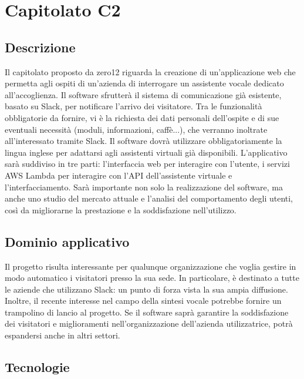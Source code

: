 \newpage
\section{Capitolato C2}

\subsection{Descrizione}

Il capitolato proposto da zero12 riguarda la creazione di un'applicazione
web che permetta agli ospiti di un'azienda di interrogare un assistente
vocale dedicato all'accoglienza. Il software sfrutterà il sistema
di comunicazione già esistente, basato su Slack, per notificare l'arrivo dei visitatore. Tra le funzionalità obbligatorie da fornire,
vi è la richiesta dei dati personali dell'ospite e di sue eventuali
necessità (moduli, informazioni, caffè...), che verranno inoltrate
all'interessato tramite Slack. Il software dovrà utilizzare obbligatoriamente
la lingua inglese per adattarsi agli assistenti virtuali già disponibili.
L'applicativo sarà suddiviso in tre parti: l'interfaccia web per interagire
con l'utente, i servizi AWS Lambda per interagire con l'API dell'assistente
virtuale e l'interfacciamento. Sarà importante non solo la realizzazione
del software, ma anche uno studio del mercato attuale e l'analisi
del comportamento degli utenti, così da migliorarne la prestazione
e la soddisfazione nell'utilizzo.

\subsection{Dominio applicativo}

Il progetto risulta interessante per qualunque organizzazione che voglia
gestire in modo automatico i visitatori presso la sua sede. In particolare,
è destinato a tutte le aziende che utilizzano Slack: un punto di forza vista
la sua ampia diffusione. Inoltre, il recente interesse nel campo della
sintesi vocale potrebbe fornire un trampolino di lancio al progetto.
Se il software saprà garantire la soddisfazione dei visitatori e miglioramenti
nell'organizzazione dell'azienda utilizzatrice, potrà espandersi
anche in altri settori.

\subsection{Tecnologie}

